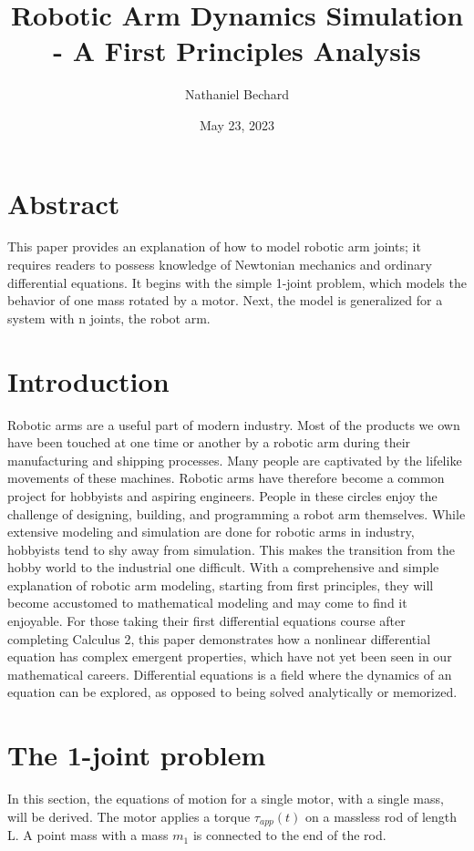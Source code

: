 \documentclass{article}
\title{Robotic Arm Dynamics Simulation - A First Principles Analysis}
\author{Nathaniel Bechard}
\date{May 23, 2023}
\begin{document}
\maketitle
\tableofcontents %

\section{Abstract}
This paper provides an explanation of how to model robotic arm joints; it requires readers to possess knowledge of Newtonian mechanics and ordinary differential equations. It begins with the simple 1-joint problem, which models the behavior of one mass rotated by a motor. Next, the model is generalized for a system with n joints, the robot arm.

%

\section{Introduction}
Robotic arms are a useful part of modern industry. Most of the products we own have been touched at one time or another by a robotic arm during their manufacturing and shipping processes. Many people are captivated by the lifelike movements of these machines. Robotic arms have therefore become a common project for hobbyists and aspiring engineers. People in these circles enjoy the challenge of designing, building, and programming a robot arm themselves. While extensive modeling and simulation are done for robotic arms in industry, hobbyists tend to shy away from simulation. This makes the transition from the hobby world to the industrial one difficult. With a comprehensive and simple explanation of robotic arm modeling, starting from first principles, they will become accustomed to mathematical modeling and may come to find it enjoyable. For those taking their first differential equations course after completing Calculus 2, this paper demonstrates how a nonlinear differential equation has complex emergent properties, which have not yet been seen in our mathematical careers. Differential equations is a field where the dynamics of an equation can be explored, as opposed to being solved analytically or memorized.

\section{The 1-joint problem}
In this section, the equations of motion for a single motor, with a single mass, will be derived. The motor applies a torque $\tau_{app}(t)$ on a massless rod of length L. A point mass with a mass $m_1$ is connected to the end of the rod. 
\end{document}
